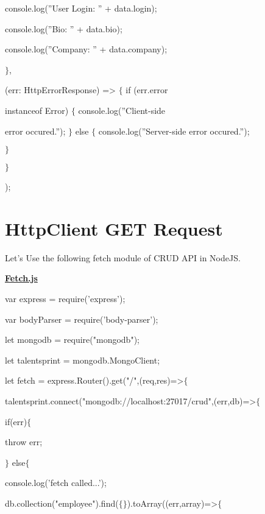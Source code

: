 \documentclass[11pt,twoside]{article}
\begin{document}
console.log(”User Login: ” + data.login);

console.log(”Bio: ” + data.bio);

console.log(”Company: ” + data.company);

$\}$,

(err: HttpErrorResponse) => $\{$ if (err.error

instanceof Error) $\{$ console.log(”Client-side

error occured.”); $\}$ else $\{$ console.log(”Server-side error occured.”); 

$\}$

$\}$

);

\vspace{18\baselineskip}
\section*{HttpClient GET Request}

Let's Use the following fetch module of CRUD API in NodeJS.

\vspace{1\baselineskip}
\textbf{\uline{Fetch.js}}

\vspace{1\baselineskip}
var express = require('express');

var bodyParser = require('body-parser');

\vspace{1\baselineskip}
let mongodb = require("mongodb");

let talentsprint = mongodb.MongoClient;

\vspace{1\baselineskip}
let fetch = express.Router().get("/",(req,res)=>$\{$ 

\hspace*{10}talentsprint.connect("mongodb://localhost:27017/crud",(err,db)=>$\{$

\hspace*{20}if(err)$\{$

\hspace*{30}throw err;

\hspace*{20}$\}$ else$\{$

\hspace*{30}console.log('fetch called...');

\hspace*{30}db.collection("employee").find($\{$$\}$).toArray((err,array)=>$\{$
\end{document}
